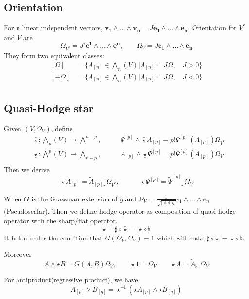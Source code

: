 \documentclass[12pt]{article}
\begin{document}
\subsection*{Orientation}
For n linear independent vectors, $\bm{v_1}\wedge\ldots\wedge\bm{v_n} = J \bm{e_1}\wedge\ldots\wedge\bm{e_n}$. Orientation for $V^*$ and $V$ are $$\Omega_{V^*} = J' \bm{e^1}\wedge\ldots\wedge\bm{e^n}, \quad \quad \Omega_{V} = J \bm{e_1}\wedge\ldots\wedge\bm{e_n} $$
They form two equivalent classes: $$ \begin{aligned}
	[\Omega] &= \{A_{[n]} \in \bigwedge\nolimits_n(V) | A_{[n]} = J \Omega, \quad J > 0\} \\
	[-\Omega] &= \{A_{[n]} \in \bigwedge\nolimits_n(V) | A_{[n]} = J \Omega, \quad J < 0\} \\
\end{aligned}$$

\subsection*{Quasi-Hodge star}
Given $(V, \Omega_V)$, define 
$$
\begin{aligned}
	&\bar{\star}: \bigwedge\nolimits_p (V) \rightarrow \bigwedge\nolimits^{n-p}, \quad \quad &\Psi^{[p]} \wedge \bar{\star} A_{[p]} = p! \Psi^{[p]} (A_{[p]})\Omega_{V^*} \\
	&\underline{\star}: \bigwedge\nolimits^p (V) \rightarrow \bigwedge\nolimits_{n-p}, \quad \quad &A_{[p]} \wedge \underline{\star} \Psi^{[p]}  = p! \Psi^{[p]} (A_{[p]})\Omega_{V} \\
\end{aligned}
$$
Then we derive $$  \bar{\star} A_{[p]} = \tilde{A}_{[p]} \rfloor \Omega_{V^*}, \quad \quad \quad \underline{\star} \Psi^{[p]} = \tilde{\Psi}^{[p]} \rfloor \Omega_V$$



When $G$ is the Grassman extension of $g$ and $\Omega_V = \frac{1}{\sqrt{|\det g|}} e_1 \wedge \ldots \wedge e_n$(Pseudoscalar). Then we define hodge operator as composition of quasi hodge operator with the sharp/flat operator.
 $$\star = \sharp \circ \bar{\star} = \underline{\star} \circ \flat$$
It holds under the condition that $G(\Omega_V, \Omega_V) = 1$ which will make $\sharp \circ \bar{\star} = \underline{\star} \circ \flat$. 

Moreover $$ A\wedge\star B = G(A, B) \Omega_V, \quad \quad \star 1 = \Omega_V \quad \quad \star A = \tilde{A}_\flat \rfloor \Omega_V$$

For antiproduct(regressive product), we have $$ A_{[p]} \vee B_{[q]} = \star^{-1} (\star A_{[p]} \wedge \star B_{[q]})$$
\end{document}

